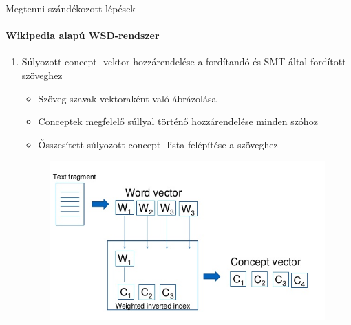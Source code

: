 \begin{frame}{Megtenni szándékozott lépések}
\framesubtitle{Wikipedia alapú WSD-rendszer}

	\begin{enumerate}
		\restorecounter
		
		\item Súlyozott concept- vektor hozzárendelése a fordítandó és SMT által fordított szöveghez
		\begin{itemize}
			\item Szöveg szavak vektoraként való ábrázolása 
			\item Conceptek megfelelő súllyal történő hozzárendelése minden szóhoz
			\item Ősszesített súlyozott concept- lista felépítése a szöveghez
		\end{itemize}
		
		\begin{figure}[t]
			\includegraphics[scale=0.4]{images/textfragment}
 		\end{figure}			
 		
	\savecounter
 	
	\end{enumerate}
	
\end{frame}

